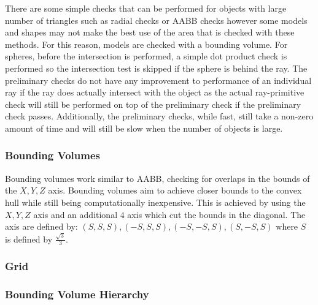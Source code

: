 \documentclass[final]{cmpreport}
\begin{document}
There are some simple checks that can be performed for objects with large number of triangles such as radial checks or AABB checks however some models and shapes may not make the best use of the area that is checked with these methods. For this reason, models are checked with a bounding volume. For spheres, before the intersection is performed, a simple dot product check is performed so the intersection test is skipped if the sphere is behind the ray. The preliminary checks do not have any improvement to performance of an individual ray if the ray does actually intersect with the object as the actual ray-primitive check will still be performed on top of the preliminary check if the preliminary check passes. Additionally, the preliminary checks, while fast, still take a non-zero amount of time and will still be slow when the number of objects is large.

\subsubsection{Bounding Volumes}

Bounding volumes work similar to AABB, checking for overlaps in the bounds of the $X, Y, Z$ axis. Bounding volumes aim to achieve closer bounds to the convex hull while still being computationally inexpensive. This is achieved by using the $X, Y, Z$ axis and an additional $4$ axis which cut the bounds in the diagonal. The axis are defined by: $(S, S ,S), (-S, S ,S), (-S, -S, S), (S, -S, S)$ where $S$ is defined by $\frac{\sqrt{3}}{3}$.

\subsubsection{Grid}

\subsubsection{Bounding Volume Hierarchy}
\end{document}
